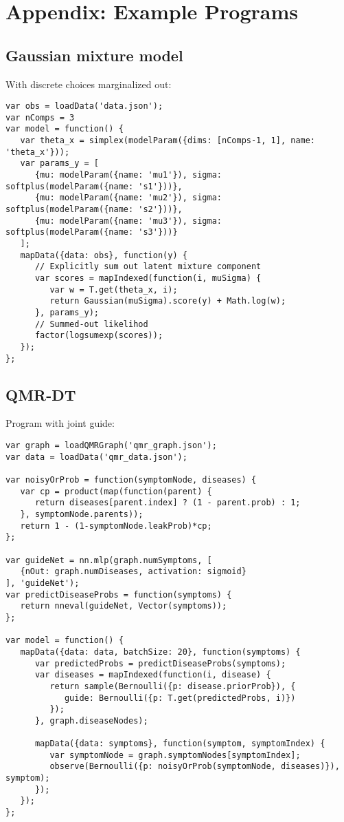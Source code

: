
\section{Appendix: Example Programs}
\label{sec:appendix_code}

\subsection{Gaussian mixture model}
\label{sec:appendix_code:gmmSumOut}

With discrete choices marginalized out:
\begin{lstlisting}
var obs = loadData('data.json');
var nComps = 3
var model = function() {
   var theta_x = simplex(modelParam({dims: [nComps-1, 1], name: 'theta_x'}));
   var params_y = [
      {mu: modelParam({name: 'mu1'}), sigma: softplus(modelParam({name: 's1'}))},
      {mu: modelParam({name: 'mu2'}), sigma: softplus(modelParam({name: 's2'}))},
      {mu: modelParam({name: 'mu3'}), sigma: softplus(modelParam({name: 's3'}))}
   ];
   mapData({data: obs}, function(y) {
      // Explicitly sum out latent mixture component
      var scores = mapIndexed(function(i, muSigma) {
         var w = T.get(theta_x, i);
         return Gaussian(muSigma).score(y) + Math.log(w);
      }, params_y);
      // Summed-out likelihod
      factor(logsumexp(scores));
   });
};
\end{lstlisting}

\subsection{QMR-DT}
\label{sec:appendix_code:qmr}

Program with joint guide:
\begin{lstlisting}
var graph = loadQMRGraph('qmr_graph.json');
var data = loadData('qmr_data.json');

var noisyOrProb = function(symptomNode, diseases) {
   var cp = product(map(function(parent) {
      return diseases[parent.index] ? (1 - parent.prob) : 1;
   }, symptomNode.parents));
   return 1 - (1-symptomNode.leakProb)*cp;
};

var guideNet = nn.mlp(graph.numSymptoms, [
   {nOut: graph.numDiseases, activation: sigmoid}
], 'guideNet');
var predictDiseaseProbs = function(symptoms) {
   return nneval(guideNet, Vector(symptoms));
};

var model = function() {
   mapData({data: data, batchSize: 20}, function(symptoms) {
      var predictedProbs = predictDiseaseProbs(symptoms);
      var diseases = mapIndexed(function(i, disease) {
         return sample(Bernoulli({p: disease.priorProb}), {
            guide: Bernoulli({p: T.get(predictedProbs, i)})
         });
      }, graph.diseaseNodes);

      mapData({data: symptoms}, function(symptom, symptomIndex) {
         var symptomNode = graph.symptomNodes[symptomIndex];
         observe(Bernoulli({p: noisyOrProb(symptomNode, diseases)}), symptom);
      });
   });
};
\end{lstlisting}


